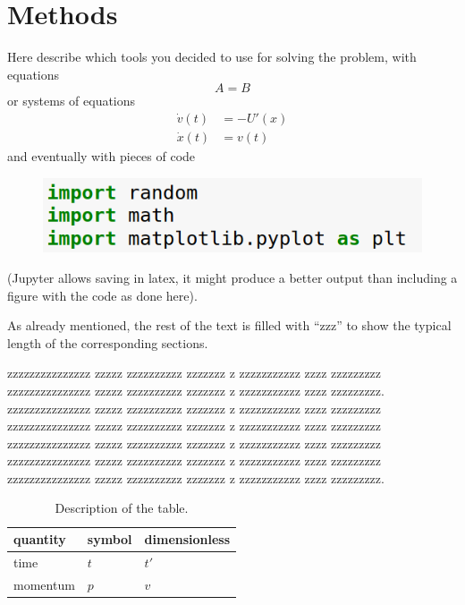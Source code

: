 \documentclass[prl,twocolumn]{revtex4-1}
\begin{document}
 \section{Methods}

 Here describe which tools you decided to use for solving the problem, with
 equations
\begin{equation}
  A=B
  \label{eq:simple}
\end{equation}
or systems of equations
\begin{align}
  \dot v(t) & =  -U'(x)\nonumber \\
  \dot x(t) & =  v(t)
  \label{eq:motion}
\end{align}
and  eventually with  pieces of code
\begin{figure}[h]
  \includegraphics[width=0.7\columnwidth]{line1.png}
\end{figure}
(Jupyter allows saving in latex, it might produce a better output than including a figure with the code as done here).

  As already mentioned, the rest of the text is filled with ``zzz'' to show the typical length of the corresponding sections.


  zzzzzzzzzzzzzzz zzzzz zzzzzzzzzz zzzzzzz z zzzzzzzzzzz zzzz zzzzzzzzz
  zzzzzzzzzzzzzzz zzzzz zzzzzzzzzz zzzzzzz z zzzzzzzzzzz zzzz zzzzzzzzz.
  zzzzzzzzzzzzzzz zzzzz zzzzzzzzzz zzzzzzz z zzzzzzzzzzz zzzz zzzzzzzzz
  zzzzzzzzzzzzzzz zzzzz zzzzzzzzzz zzzzzzz z zzzzzzzzzzz zzzz zzzzzzzzz
  zzzzzzzzzzzzzzz zzzzz zzzzzzzzzz zzzzzzz z zzzzzzzzzzz zzzz zzzzzzzzz
  zzzzzzzzzzzzzzz zzzzz zzzzzzzzzz zzzzzzz z zzzzzzzzzzz zzzz zzzzzzzzz
  zzzzzzzzzzzzzzz zzzzz zzzzzzzzzz zzzzzzz z zzzzzzzzzzz zzzz zzzzzzzzz.


  
\begin{table}[!b]
\begin{center}
\begin{tabular}{lll}
quantity & symbol & dimensionless \\
\hline
time & $t$ & $t'$  \\
momentum & $p$ & $v$
\end{tabular}
\end{center}
\caption{Description of the table.}
\label{tab:1}
\end{table}
\end{document}
